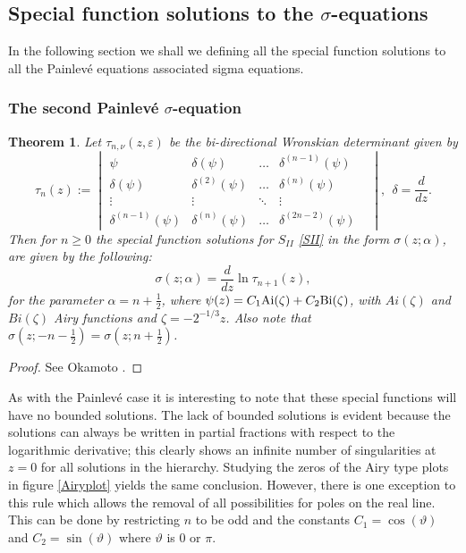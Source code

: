 \documentclass[12pt]{article}
\def\P{Painlev\'e }
\newtheorem{mydef}{Theorem}[section]
\numberwithin{figure}{section}
\numberwithin{equation}{section}
\numberwithin{table}{section}
\begin{document}
\subsection{Special function solutions to the $\sigma$-equations}
In the following section we shall we defining all the special function solutions to all the \P equations associated sigma equations.
\subsubsection{The second \P $\sigma$-equation}
\begin{mydef}
Let $\tau_{n,\nu}(z,\varepsilon)$ be the bi-directional Wronskian determinant given by
\[
\tau_{n}(z):=
\!\begin{vmatrix}
\psi & \delta(\psi) &\hdots& \delta^{(n-1)}(\psi) \\
\delta(\psi) & \delta^{(2)}(\psi) &\hdots& \delta^{(n)}(\psi)  \\
\vdots &\vdots & \ddots & \vdots & \\
\delta^{(n-1)}(\psi) & \delta^{(n)}(\psi) &\hdots& \delta^{(2n-2)}(\psi)
\end{vmatrix},~~\delta=\frac{d}{dz}.
\]
Then for $n\geq0$ the special function solutions for $S_{II}$ \eqref{SII} in the form $\sigma(z;\alpha)$, are given by the following:
\begin{equation}
\sigma(z;\alpha)=\frac{d}{dz}\ln\tau_{n+1}(z),
\end{equation}
for the parameter $\alpha=n+\tfrac{1}{2}$,
where $\psi(z)=C_1{\rm{Ai}}(\zeta)+C_2{\rm{Bi}}(\zeta)$, with $Ai(\zeta)$ and $Bi(\zeta)$ Airy functions and $\zeta=-2^{-1/3}z$. Also note that $\sigma(z;-n-\tfrac{1}{2})=\sigma(z;n+\tfrac{1}{2})$.
\end{mydef}
\begin{proof}
See Okamoto \cite{P:275:221}.
\end{proof}
As with the \P case it is interesting to note that these special functions will have no bounded solutions. The lack of bounded solutions is evident because the solutions can always be written in partial fractions with respect to the logarithmic derivative; this clearly shows an infinite number of singularities at $z=0$ for all solutions in the hierarchy. Studying the zeros of the Airy type plots in figure \ref{Airyplot} yields the same conclusion. However, there is one exception to this rule which allows the removal of all possibilities for poles on the real line. This can be done by restricting $n$ to be odd and the constants $C_1=\cos(\vartheta)$ and $C_2=\sin(\vartheta)$ where $\vartheta$ is $0$ or $\pi$.
\end{document}
